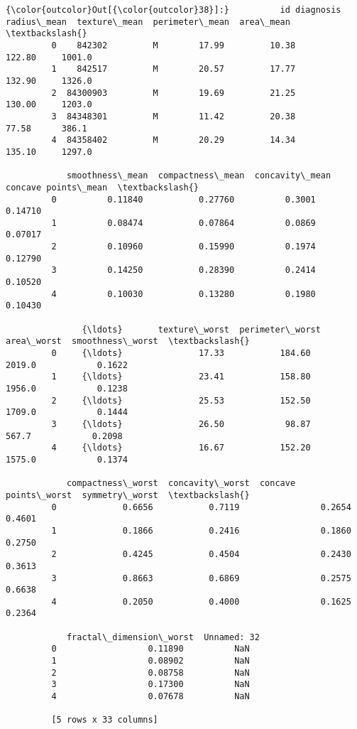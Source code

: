 \documentclass[11pt]{article}
\begin{document}
\begin{Verbatim}[commandchars=\\\{\}]
{\color{outcolor}Out[{\color{outcolor}38}]:}          id diagnosis  radius\_mean  texture\_mean  perimeter\_mean  area\_mean  \textbackslash{}
         0    842302         M        17.99         10.38          122.80     1001.0   
         1    842517         M        20.57         17.77          132.90     1326.0   
         2  84300903         M        19.69         21.25          130.00     1203.0   
         3  84348301         M        11.42         20.38           77.58      386.1   
         4  84358402         M        20.29         14.34          135.10     1297.0   
         
            smoothness\_mean  compactness\_mean  concavity\_mean  concave points\_mean  \textbackslash{}
         0          0.11840           0.27760          0.3001              0.14710   
         1          0.08474           0.07864          0.0869              0.07017   
         2          0.10960           0.15990          0.1974              0.12790   
         3          0.14250           0.28390          0.2414              0.10520   
         4          0.10030           0.13280          0.1980              0.10430   
         
               {\ldots}       texture\_worst  perimeter\_worst  area\_worst  smoothness\_worst  \textbackslash{}
         0     {\ldots}               17.33           184.60      2019.0            0.1622   
         1     {\ldots}               23.41           158.80      1956.0            0.1238   
         2     {\ldots}               25.53           152.50      1709.0            0.1444   
         3     {\ldots}               26.50            98.87       567.7            0.2098   
         4     {\ldots}               16.67           152.20      1575.0            0.1374   
         
            compactness\_worst  concavity\_worst  concave points\_worst  symmetry\_worst  \textbackslash{}
         0             0.6656           0.7119                0.2654          0.4601   
         1             0.1866           0.2416                0.1860          0.2750   
         2             0.4245           0.4504                0.2430          0.3613   
         3             0.8663           0.6869                0.2575          0.6638   
         4             0.2050           0.4000                0.1625          0.2364   
         
            fractal\_dimension\_worst  Unnamed: 32  
         0                  0.11890          NaN  
         1                  0.08902          NaN  
         2                  0.08758          NaN  
         3                  0.17300          NaN  
         4                  0.07678          NaN  
         
         [5 rows x 33 columns]
\end{Verbatim}
            
\end{document}
